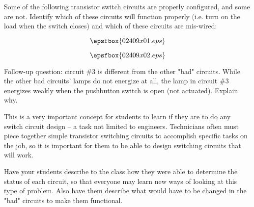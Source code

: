 

Some of the following transistor switch circuits are properly configured, and some are not.  Identify which of these circuits will function properly (i.e. turn on the load when the switch closes) and which of these circuits are mis-wired:

$$\epsfbox{02409x01.eps}$$







$$\epsfbox{02409x02.eps}$$

\vskip 10pt

Follow-up question: circuit \#3 is different from the other "bad" circuits.  While the other bad circuits' lamps do not energize at all, the lamp in circuit \#3 energizes weakly when the pushbutton switch is open (not actuated).  Explain why.







This is a very important concept for students to learn if they are to do any switch circuit design -- a task not limited to engineers.  Technicians often must piece together simple transistor switching circuits to accomplish specific tasks on the job, so it is important for them to be able to design switching circuits that will work.

Have your students describe to the class how they were able to determine the status of each circuit, so that everyone may learn new ways of looking at this type of problem.  Also have them describe what would have to be changed in the "bad" circuits to make them functional.




